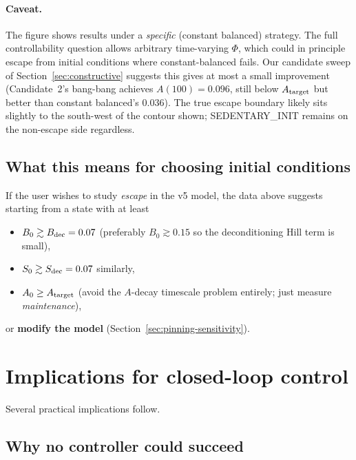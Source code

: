\documentclass[11pt,a4paper]{article}
\theoremstyle{definition}
\begin{document}
\paragraph{Caveat.} The figure shows results under a \emph{specific} (constant balanced) strategy. The full controllability question allows arbitrary time-varying $\Phi$, which could in principle escape from initial conditions where constant-balanced fails. Our candidate sweep of Section~\ref{sec:constructive} suggests this gives at most a small improvement (Candidate~2's bang-bang achieves $A(100) = 0.096$, still below $A_{\rm target}$ but better than constant balanced's $0.036$). The true escape boundary likely sits slightly to the south-west of the contour shown; SEDENTARY\_INIT remains on the non-escape side regardless.

\subsection{What this means for choosing initial conditions}

If the user wishes to study \emph{escape} in the v5 model, the data above suggests starting from a state with at least
\begin{itemize}
  \item $B_0 \gtrsim B_{\rm dec} = 0.07$ (preferably $B_0 \gtrsim 0.15$ so the deconditioning Hill term is small),
  \item $S_0 \gtrsim S_{\rm dec} = 0.07$ similarly,
  \item $A_0 \ge A_{\rm target}$ (avoid the $A$-decay timescale problem entirely; just measure \emph{maintenance}),
\end{itemize}
or \textbf{modify the model} (Section~\ref{sec:pinning-sensitivity}).

\section{Implications for closed-loop control} \label{sec:closed-loop}

Several practical implications follow.

\subsection{Why no controller could succeed}
\end{document}
